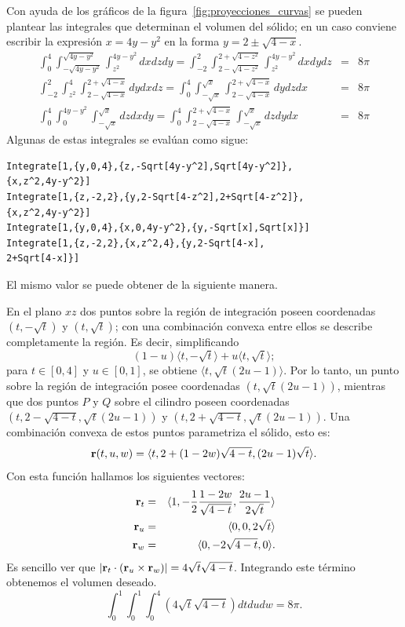 Con ayuda de los gráficos de la figura~\ref{fig:proyecciones_curvas} se pueden plantear las integrales que determinan el volumen del sólido; en un caso conviene escribir la expresión $x=4y-y^2$ en la forma
$y=2\pm \sqrt{4-x}$.
\begin{eqnarray*}
\int_{0}^{4}\int_{-\sqrt{4y-y^2}}^{\sqrt{4y-y^2}}\int_{z^2}^{4y-y^2}dxdzdy= \int_{-2}^2\int_{2-\sqrt{4-z^2}}^{2+\sqrt{4-z^2}}\int_{z^2}^{4y-y^2}dxdydz &=& 8\pi \\
\int_{-2}^2\int_{z^2}^{4}\int_{2-\sqrt{4-x}}^{2+\sqrt{4-x}}dydxdz=\int_{0}^{4}\int_{-\sqrt{x}}^{\sqrt{x}}\int_{2-\sqrt{4-x}}^{2+\sqrt{4-x}}dydzdx &=& 8\pi \\
\int_{0}^{4}\int_{0}^{4y-y^2}\int_{-\sqrt{x}}^{\sqrt{x}}dzdxdy= \int_{0}^{4}\int_{2-\sqrt{4-x}}^{2+\sqrt{4-x}}\int_{-\sqrt{x}}^{\sqrt{x}}dzdydx &= & 8\pi
\end{eqnarray*}
Algunas de estas integrales se evalúan como sigue:

\begin{tcolorbox}[title=\bf Instrucción en \verb"Mathematica"]\begin{Verbatim}[formatcom=\letraverbatim]
Integrate[1,{y,0,4},{z,-Sqrt[4y-y^2],Sqrt[4y-y^2]},
{x,z^2,4y-y^2}]
Integrate[1,{z,-2,2},{y,2-Sqrt[4-z^2],2+Sqrt[4-z^2]},
{x,z^2,4y-y^2}]
Integrate[1,{y,0,4},{x,0,4y-y^2},{y,-Sqrt[x],Sqrt[x]}]
Integrate[1,{z,-2,2},{x,z^2,4},{y,2-Sqrt[4-x],
2+Sqrt[4-x]}]
\end{Verbatim}
\end{tcolorbox}

El mismo valor se puede obtener de la siguiente manera.

En el plano $xz$ dos puntos sobre la región de integración poseen coordenadas
$( t,-\sqrt{t})$ y $(t,\sqrt{t})$; con una combinación convexa entre ellos se describe completamente la región.
Es decir, simplificando
%
\[( 1-u) \langle t,-\sqrt{t}\rangle +u\langle t,\sqrt{t}\rangle;\]
%
para $t\in [0,4]$ y $u\in [0,1]$,
se obtiene $\langle t,\sqrt{t}(2u-1)\rangle$. Por lo tanto, un punto sobre la región de integración posee coordenadas $( t,\sqrt{t}( 2u-1))$,
mientras que dos puntos $P$ y $Q$ sobre el cilindro poseen coordenadas
$( t,2-\sqrt{4-t},\sqrt{t}( 2u-1) ) $ y $( t,2+\sqrt{4-t},\sqrt{t}( 2u-1) ) $. %
Una combinación convexa de estos puntos parametriza el sólido, esto es:
%
{\small
\[{\bf r}(t,u,w) = \langle t,2+( 1-2w) \sqrt{4-t},( 2u-1) \sqrt{t}\rangle.\]
}
%
Con esta función hallamos los siguientes vectores:
{\small
\begin{eqnarray*}
{\bf r}_t & =& \langle 1,-\frac{1}{2}\frac{1-2w}{\sqrt{4-t}},\frac{2u-1}{2\sqrt{t}}\rangle \\
{\bf r}_u & =& \langle 0,0,2\sqrt{t}\rangle \\
{\bf r}_w & =& \langle 0,-2\sqrt{4-t},0\rangle.
\end{eqnarray*}
}
Es sencillo ver que $|{\bf r}_t \cdot ({\bf r}_u \times {\bf r}_w )| = 4\sqrt{t}\sqrt{4-t}$.
Integrando este término obtenemos el volumen deseado.
%
\[\int_{0}^{1}\int_{0}^{1}\int_{0}^{4}( 4\sqrt{t}\sqrt{4-t}) dtdudw =8\pi.\]
%

